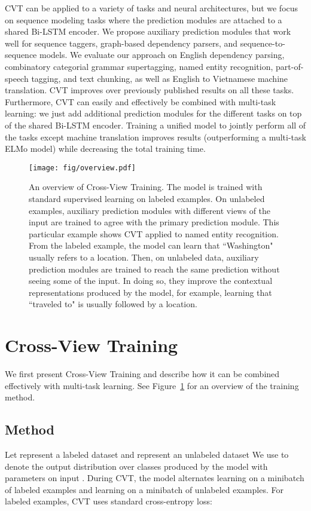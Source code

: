 \documentclass[11pt,a4paper]{article}
\begin{document}
CVT can be applied to a variety of tasks and neural architectures, but we focus on sequence modeling tasks where the prediction modules are attached to a shared Bi-LSTM encoder. We propose auxiliary prediction modules that work well for sequence taggers, graph-based dependency parsers, and sequence-to-sequence models.
We evaluate our approach on English dependency parsing, combinatory categorial grammar supertagging, named entity recognition, part-of-speech tagging, and text chunking, as well as English to Vietnamese machine translation.
CVT improves over previously published results on all these tasks.
Furthermore, CVT can easily and effectively be combined with multi-task learning: we just add additional prediction modules for the different tasks on top of the shared Bi-LSTM encoder. 
Training a unified model to jointly perform all of the tasks except machine translation improves results (outperforming a multi-task ELMo model) while decreasing the total training time. 


\begin{figure}[t]
\texttt{[image: fig/overview.pdf]}
\caption{An overview of Cross-View Training.
The model is trained with standard supervised learning on labeled examples.
On unlabeled examples, auxiliary prediction modules with different views of the input are trained to agree with the primary prediction module. 
This particular example shows CVT applied to named entity recognition. From the labeled example, the model can learn that ``Washington" usually refers to a location. 
Then, on unlabeled data, auxiliary prediction modules are trained to reach the same prediction without seeing some of the input. In doing so, they improve the contextual representations produced by the model, for example, learning that ``traveled to" is usually followed by a location.
}
\label{fig:overview}
\end{figure}





\section{Cross-View Training}
We first present Cross-View Training and describe how it can be combined effectively with multi-task learning. See Figure~\ref{fig:overview} for an overview of the training method.

\subsection{Method}
Let  represent a labeled dataset and   represent an unlabeled dataset
We use  to denote the output distribution over classes produced by the model with parameters  on input .
During CVT, the model alternates learning on a minibatch of labeled examples and learning on a minibatch of unlabeled examples. 
For labeled examples, CVT uses standard cross-entropy loss:
\end{document}
